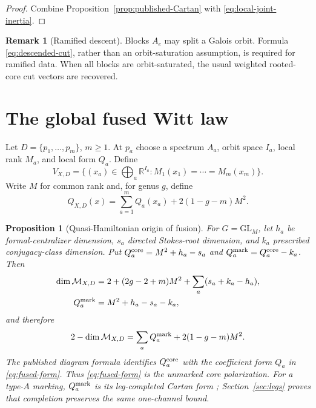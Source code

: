 \documentclass[11pt,a4paper]{amsart}
\theoremstyle{plain}
\newtheorem{proposition}[theorem]{Proposition}
\theoremstyle{definition}
\newtheorem{remark}[theorem]{Remark}
\newcommand{\RR}{\mathbb R}
\newcommand{\Mcal}{\mathcal M}
\begin{document}
\begin{proof}
Combine Proposition~\ref{prop:published-Cartan} with
\eqref{eq:local-joint-inertia}.
\end{proof}

\begin{remark}[Ramified descent]
Blocks $A_e$ may split a Galois orbit.  Formula \eqref{eq:descended-cut}, rather than an
orbit-saturation assumption, is required for ramified data.  When all blocks are orbit-saturated,
the usual weighted rooted-core cut vectors are recovered.
\end{remark}

\section{The global fused Witt law}\label{sec:global}

Let $D=\{p_1,\ldots,p_m\}$, $m\geq1$.  At $p_a$ choose a spectrum $A_a$, orbit space $I_a$,
local rank $M_a$, and local form $Q_a$.  Define
\begin{equation}\label{eq:fibre-product}
 V_{X,D}=\{(x_a)\in\bigoplus_a\RR^{I_a}:M_1(x_1)=\cdots=M_m(x_m)\}.
\end{equation}
Write $M$ for common rank and, for genus $g$, define
\begin{equation}\label{eq:fused-form}
             Q_{X,D}(x)=\sum_{a=1}^{m}Q_a(x_a)+2(1-g-m)M^2.
\end{equation}

\begin{proposition}[Quasi-Hamiltonian origin of fusion]\label{prop:qh-fusion}
For $G=\mathrm{GL}_M$, let $h_a$ be formal-centralizer dimension, $s_a$ directed
Stokes-root dimension, and $k_a$ prescribed conjugacy-class dimension.  Put
$Q_a^{\rm core}=M^2+h_a-s_a$ and $Q_a^{\rm mark}=Q_a^{\rm core}-k_a$.  Then
\begin{align}\label{eq:qh-dimension}
 \dim\Mcal_{X,D}
 &=2+(2g-2+m)M^2+\sum_a(s_a+k_a-h_a),\\
 Q_a^{\rm mark}&=M^2+h_a-s_a-k_a,
\end{align}
and therefore
\begin{equation}\label{eq:qh-fusion-identity}
       2-\dim\Mcal_{X,D}=\sum_aQ_a^{\rm mark}+2(1-g-m)M^2.
\end{equation}
The published diagram formula identifies $Q_a^{\rm core}$ with the coefficient form $Q_a$ in
\eqref{eq:fused-form}.  Thus \eqref{eq:fused-form} is the unmarked core polarization.  For a
type-$A$ marking, $Q_a^{\rm mark}$ is its leg-completed Cartan form
\cite{BoalchYamakawa2020,Doucot2021}; Section~\ref{sec:legs} proves that completion preserves the
same one-channel bound.
\end{proposition}
\end{document}

